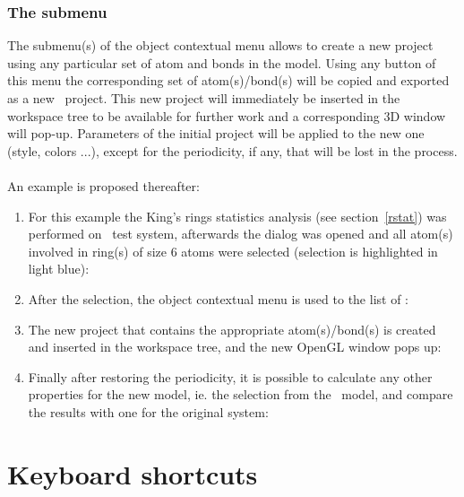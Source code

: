 \subsubsection{The  submenu}
\label{meditnewp}

The  submenu(s) of the object contextual menu allows to create a new project using any particular set of atom and bonds in the model. 
\newpage
{}
\noindent Using any button of this menu the corresponding set of atom(s)/bond(s) will be copied and exported as a new \atomes\ project.
This new project will immediately be inserted in the workspace tree to be available for further work and a corresponding 3D window will pop-up. 
Parameters of the initial project will be applied to the new one (style, colors ...), except for the periodicity, if any, that will be lost in the process. \\
\\An example is proposed thereafter: \\
\begin{enumerate}
\item For this example the King's rings statistics analysis (see section~\ref{rstat}) was performed on \sio\ test system, 
afterwards the  dialog was opened and all atom(s) involved in ring(s) of size 6 atoms were selected (selection is highlighted in light blue):
\begin{center}
\end{center}
\newpage
\item After the selection, the object contextual menu is used to  the list of :
\begin{center}
\end{center}
\item The new project  that contains the appropriate atom(s)/bond(s) is created and inserted in the workspace tree, and the new OpenGL window pops up:
\begin{center}
\end{center}
\newpage
\item Finally after restoring the periodicity, it is possible to calculate any other properties for the new model, ie. the selection from the \sio\ model, 
and compare the results with one for the original system:
\begin{center}
\end{center}
\end{enumerate}

\clearpage

\section{Keyboard shortcuts}

\kbdviz
